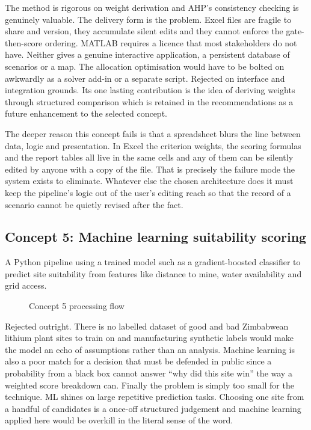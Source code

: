 \documentclass[12pt,a4paper]{report}
\begin{document}
The method is rigorous on weight derivation and AHP's consistency
checking is genuinely valuable. The delivery form is the problem.
Excel files are fragile to share and version, they accumulate silent
edits and they cannot enforce the gate-then-score ordering. MATLAB
requires a licence that most stakeholders do not have. Neither gives
a genuine interactive application, a persistent database of scenarios
or a map. The allocation optimisation would have to be bolted on
awkwardly as a solver add-in or a separate script. Rejected on
interface and integration grounds. Its one lasting contribution is
the idea of deriving weights through structured comparison which is
retained in the recommendations as a future enhancement to the
selected concept.

The deeper reason this concept fails is that a spreadsheet blurs the
line between data, logic and presentation. In Excel the criterion
weights, the scoring formulas and the report tables all live in the
same cells and any of them can be silently edited by anyone with a
copy of the file. That is precisely the failure mode the system exists
to eliminate. Whatever else the chosen architecture does it must keep
the pipeline's logic out of the user's editing reach so that the
record of a scenario cannot be quietly revised after the fact.

\subsection{Concept 5: Machine learning suitability scoring}
A Python pipeline using a trained model such as a gradient-boosted
classifier to predict site suitability from features like distance to
mine, water availability and grid access.

\begin{figure}[h]
\centering
{}
\caption{Concept 5 processing flow}
\end{figure}

Rejected outright. There is no labelled dataset of good and bad
Zimbabwean lithium plant sites to train on and manufacturing synthetic
labels would make the model an echo of assumptions rather than an
analysis. Machine learning is also a poor match for a decision that
must be defended in public since a probability from a black box cannot
answer ``why did this site win'' the way a weighted score breakdown
can. Finally the problem is simply too small for the technique. ML
shines on large repetitive prediction tasks. Choosing one site from a
handful of candidates is a once-off structured judgement and machine
learning applied here would be overkill in the literal sense of the
word.
\end{document}
